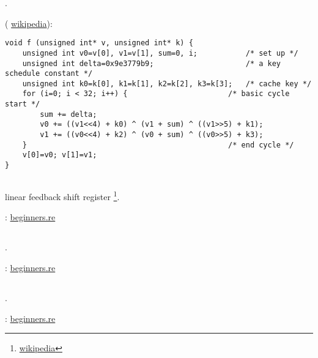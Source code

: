 .

 ( \href{http://go.yurichev.com/17106}{wikipedia}):

\begin{lstlisting}
void f (unsigned int* v, unsigned int* k) {
    unsigned int v0=v[0], v1=v[1], sum=0, i;           /* set up */
    unsigned int delta=0x9e3779b9;                     /* a key schedule constant */
    unsigned int k0=k[0], k1=k[1], k2=k[2], k3=k[3];   /* cache key */
    for (i=0; i < 32; i++) {                       /* basic cycle start */
        sum += delta;
        v0 += ((v1<<4) + k0) ^ (v1 + sum) ^ ((v1>>5) + k1);
        v1 += ((v0<<4) + k2) ^ (v0 + sum) ^ ((v0>>5) + k3);  
    }                                              /* end cycle */
    v[0]=v0; v[1]=v1;
}
\end{lstlisting}


\subsection{}

linear feedback shift register
\footnote{\href{http://go.yurichev.com/17000}{wikipedia}}.

\Sourcecode: \href{http://go.yurichev.com/17149}{beginners.re}

\subsection{}

.

\Sourcecode: \href{http://go.yurichev.com/17150}{beginners.re}

\subsection{}

.

\Sourcecode: \href{http://go.yurichev.com/17151}{beginners.re}

